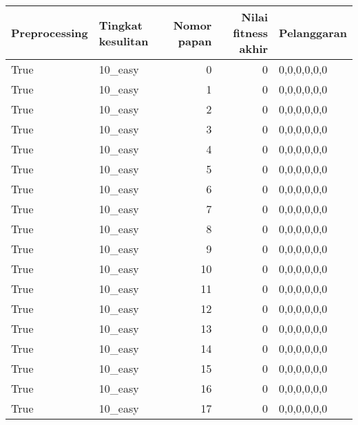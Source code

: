 \begin{tabular}{llrrl}
\hline
 Preprocessing   & Tingkat kesulitan   &   Nomor papan &   Nilai fitness akhir & Pelanggaran   \\
\hline
 True            & 10\_easy             &             0 &                     0 & 0,0,0,0,0,0   \\
 True            & 10\_easy             &             1 &                     0 & 0,0,0,0,0,0   \\
 True            & 10\_easy             &             2 &                     0 & 0,0,0,0,0,0   \\
 True            & 10\_easy             &             3 &                     0 & 0,0,0,0,0,0   \\
 True            & 10\_easy             &             4 &                     0 & 0,0,0,0,0,0   \\
 True            & 10\_easy             &             5 &                     0 & 0,0,0,0,0,0   \\
 True            & 10\_easy             &             6 &                     0 & 0,0,0,0,0,0   \\
 True            & 10\_easy             &             7 &                     0 & 0,0,0,0,0,0   \\
 True            & 10\_easy             &             8 &                     0 & 0,0,0,0,0,0   \\
 True            & 10\_easy             &             9 &                     0 & 0,0,0,0,0,0   \\
 True            & 10\_easy             &            10 &                     0 & 0,0,0,0,0,0   \\
 True            & 10\_easy             &            11 &                     0 & 0,0,0,0,0,0   \\
 True            & 10\_easy             &            12 &                     0 & 0,0,0,0,0,0   \\
 True            & 10\_easy             &            13 &                     0 & 0,0,0,0,0,0   \\
 True            & 10\_easy             &            14 &                     0 & 0,0,0,0,0,0   \\
 True            & 10\_easy             &            15 &                     0 & 0,0,0,0,0,0   \\
 True            & 10\_easy             &            16 &                     0 & 0,0,0,0,0,0   \\
 True            & 10\_easy             &            17 &                     0 & 0,0,0,0,0,0   \\

\end{tabular}
